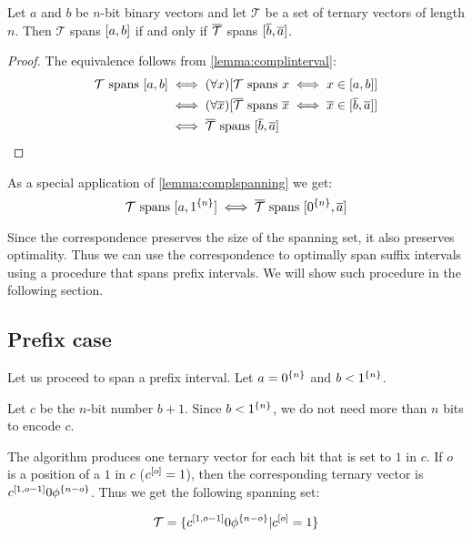 \begin{lemma}
\label{lemma:complspanning}
Let $a$ and $b$ be $n$-bit binary vectors
and let $\mathcal{T}$ be a set of ternary vectors of length $n$.
Then
$\mathcal{T}$ spans $[a, b]$
if and only if
$\overline{\mathcal{T}}$ spans $[\overline{b}, \overline{a}]$.
\end{lemma}

\begin{proof}
The equivalence follows from \cref{lemma:complinterval}:
\begin{align*}
\mathcal{T} \text{ spans } [a, b]
&\iff (\forall x) [\mathcal{T} \text{ spans } x \iff x \in [a, b]] \\
&\iff (\forall \overline{x}) [\overline{\mathcal{T}} \text{ spans } \overline{x} \iff \overline{x} \in [\overline{b}, \overline{a}]] \\
&\iff \overline{\mathcal{T}} \text{ spans } [\overline{b}, \overline{a}]
\end{align*}
\end{proof}

As a special application of \cref{lemma:complspanning}
we get:
$$
\mathcal{T} \text{ spans } [a, 1^{\{n\}}]
\iff
\overline{\mathcal{T}}
\text{ spans } [0^{\{n\}}, \overline{a}]
$$

Since the correspondence preserves
the size of the spanning set,
it also preserves optimality.
Thus we can use the correspondence to optimally span
suffix intervals
using a procedure that spans prefix intervals.
We will show such procedure in the following section.

\subsection{Prefix case}
\label{sec:prefix}

Let us proceed to span a prefix interval.
Let $a = 0^{\{n\}}$ and $b < 1^{\{n\}}$.

Let $c$ be the $n$-bit number $b + 1$.
Since $b < 1^{\{n\}}$,
we do not need more than $n$ bits to encode $c$.

The algorithm produces one ternary vector
for each bit that is set to $1$ in $c$.
If $o$ is a position of a $1$ in $c$
($c^{[o]} = 1$),
then the corresponding ternary vector
is $c^{[1, o - 1]} 0 \phi^{\{n - o\}}$.
Thus we get the following spanning set:

\begin{equation*}
\mathcal{T} =
\{c^{[1, o - 1]} 0 \phi^{\{n - o\}} | c^{[o]} = 1\}
\end{equation*}

